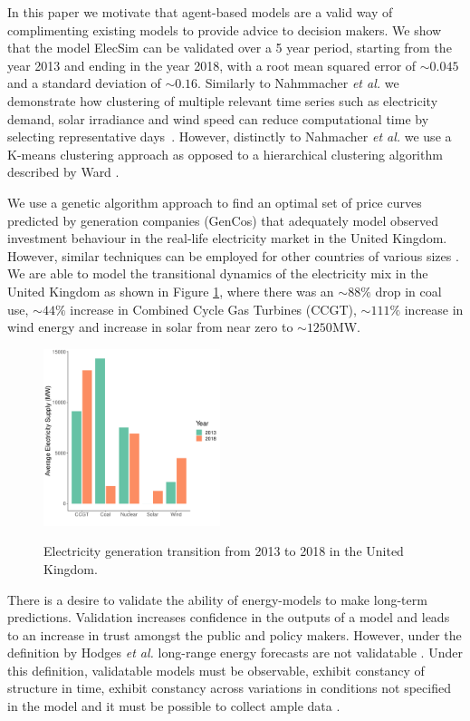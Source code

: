 \documentclass[final,3p,times,twocolumn,numbers]{elsarticle}
\begin{document}
In this paper we motivate that agent-based models are a valid way of complimenting existing models to provide advice to decision makers. We show that the model ElecSim \cite{Kell} can be validated over a 5 year period, starting from the year 2013 and ending in the year 2018, with a root mean squared error of {\color{red} $\sim0.045$} and a standard deviation of {\color{red}$\sim0.16$}. Similarly to Nahmmacher \textit{et al.} we demonstrate how clustering of multiple relevant time series such as electricity demand, solar irradiance and wind speed can reduce computational time by selecting representative days~\cite{Nahmmacher2016}. However, distinctly to Nahmacher \textit{et al.} we use a K-means clustering approach \cite{forgy65} as opposed to a hierarchical clustering algorithm described by Ward \cite{doi:10.1080/01621459.1963.10500845}.

We use a genetic algorithm approach to find an optimal set of price curves predicted by generation companies (GenCos) that  adequately model observed investment behaviour in the real-life electricity market in the United Kingdom. However, similar techniques can be employed for other countries of various sizes \cite{Kell}. We are able to model the transitional dynamics of the electricity mix in the United Kingdom as shown in Figure \ref{uk_historical_mix}, where there was an $\sim88\%$ drop in coal use, $\sim44\%$ increase in Combined Cycle Gas Turbines (CCGT), $\sim111\% $ increase in wind energy and increase in solar from near zero to $\sim 1250$MW.


\begin{figure}
\centering
\includegraphics[width=0.46\textwidth]{figures/introduction/uk_historical_mix.pdf}
\label{uk_historical_mix}
\caption{Electricity generation transition from 2013 to 2018 in the United Kingdom.}
\end{figure}

There is a desire to validate the ability of energy-models to make long-term predictions. Validation increases confidence in the outputs of a model and leads to an increase in trust amongst the public and policy makers. However, under the definition by Hodges \textit{et al.} \cite{Hodges} long-range energy forecasts are not validatable \cite{Craig2002}. Under this definition, validatable models must be observable, exhibit constancy of structure in time, exhibit constancy across variations in conditions not specified in the model and it must be possible to collect ample data \cite{Hodges}.
\end{document}
